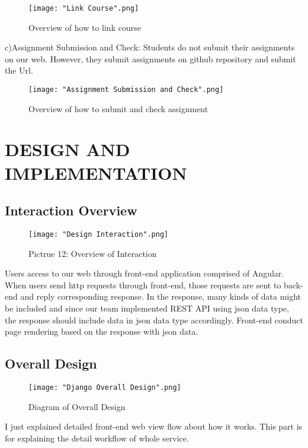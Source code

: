 \documentclass[10pt,journal,compsoc]{IEEEtran}
\begin{document}
\begin{figure}[H]
\centering
\texttt{[image: "Link Course".png]}
{\caption*{Overview of how to link course}}
\end{figure}
c)Assignment Submission and Check: Students do not submit their assignments on our web. However, they submit assignments on github repository and submit the Url. 

\begin{figure}[H]
\centering
\texttt{[image: "Assignment Submission and Check".png]}
{\caption*{Overview of how to submit and check assignment}}
\end{figure}
\bigskip
\bigskip

\ifCLASSOPTIONcompsoc
{}
\else
\section{DESIGN AND IMPLEMENTATION}
\label{sec:DESIGN AND IMPLEMENTATION}
\fi

\subsection{Interaction Overview}
\begin{figure}[H]
\centering
\texttt{[image: "Design Interaction".png]}
{\caption*{Pictrue 12: Overview of Interaction}}
\end{figure}
Users access to our web through front-end application comprised of Angular. When users send http requests through front-end, those requests are sent to back-end and reply corresponding response. In the response, many kinds of data might be included and since our team implemented REST API using json data type, the response should include data in json data type accordingly. Front-end conduct page rendering based on the response with json data. 
\subsection{Overall Design}

\begin{figure}[H]
\centering
\texttt{[image: "Django Overall Design".png]}
{\caption*{Diagram of Overall Design}}
\end{figure}
I just explained detailed front-end web view flow about how it works. This part is for explaining the detail workflow of whole service.
\end{document}
